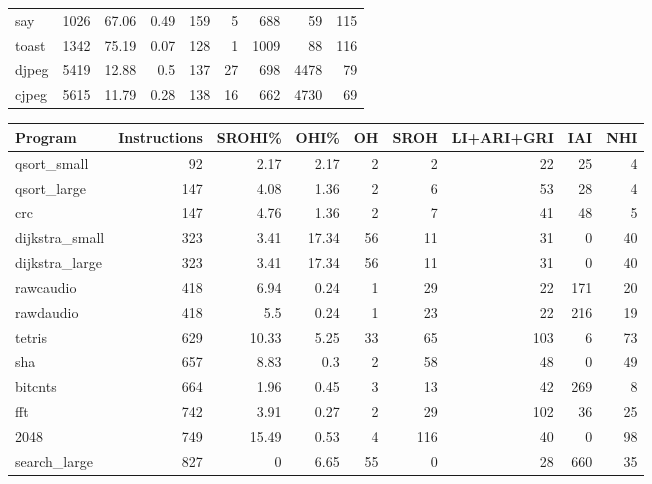 \begin{tabular}{lrrrrrrrr}
 say            &     1026 &    67.06 &   0.49 &  159 &    5 &    688 &    59 &   115 \\
 toast          &     1342 &    75.19 &   0.07 &  128 &    1 &   1009 &    88 &   116 \\
 djpeg          &     5419 &    12.88 &   0.5  &  137 &   27 &    698 &  4478 &    79 \\
 cjpeg          &     5615 &    11.79 &   0.28 &  138 &   16 &    662 &  4730 &    69 \\
\hline
\end{tabular}\begin{tabular}{lrrrrrrrr}
\hline
 Program        &   Instructions &   SROHI\% &   OHI\% &   OH &   SROH &   LI+ARI+GRI &   IAI &   NHI \\
\hline
 qsort\_small    &             92 &     2.17 &   2.17 &    2 &      2 &           22 &    25 &     4 \\
 qsort\_large    &            147 &     4.08 &   1.36 &    2 &      6 &           53 &    28 &     4 \\
 crc            &            147 &     4.76 &   1.36 &    2 &      7 &           41 &    48 &     5 \\
 dijkstra\_small &            323 &     3.41 &  17.34 &   56 &     11 &           31 &     0 &    40 \\
 dijkstra\_large &            323 &     3.41 &  17.34 &   56 &     11 &           31 &     0 &    40 \\
 rawcaudio      &            418 &     6.94 &   0.24 &    1 &     29 &           22 &   171 &    20 \\
 rawdaudio      &            418 &     5.5  &   0.24 &    1 &     23 &           22 &   216 &    19 \\
 tetris         &            629 &    10.33 &   5.25 &   33 &     65 &          103 &     6 &    73 \\
 sha            &            657 &     8.83 &   0.3  &    2 &     58 &           48 &     0 &    49 \\
 bitcnts        &            664 &     1.96 &   0.45 &    3 &     13 &           42 &   269 &     8 \\
 fft            &            742 &     3.91 &   0.27 &    2 &     29 &          102 &    36 &    25 \\
 2048           &            749 &    15.49 &   0.53 &    4 &    116 &           40 &     0 &    98 \\
 search\_large   &            827 &     0    &   6.65 &   55 &      0 &           28 &   660 &    35 \\

\end{tabular}
